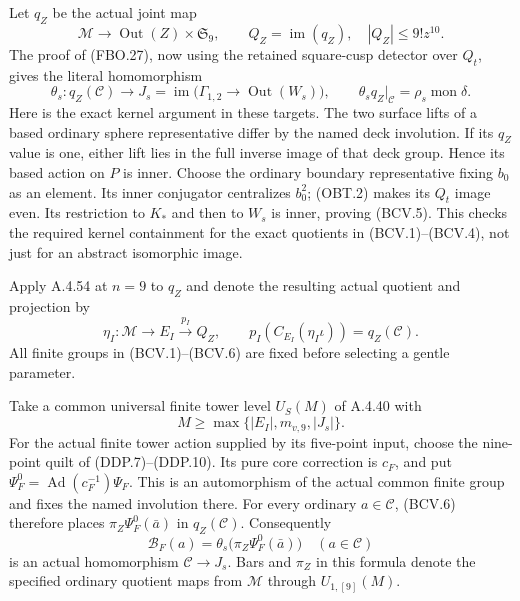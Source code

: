 Let $q_Z$ be the actual joint map
\[
 \mathcal M\longrightarrow
     \operatorname{Out}(Z)\times\mathfrak S_9,
       \qquad Q_Z=\operatorname{im}(q_Z),\quad
       |Q_Z|\leq9!z^{10}.
                                                               \tag{BCV.4}
\]
The proof of (FBO.27), now using the retained square-cusp
detector over $Q_t$, gives the literal homomorphism
\[
 \theta_s:q_Z(\mathcal C)\longrightarrow
 J_s=\operatorname{im}\bigl(\Gamma_{1,2}
                             \to\operatorname{Out}(W_s)\bigr),
 \qquad\theta_s q_Z|_{\mathcal C}=\rho_s\operatorname{mon}\delta.
                                                               \tag{BCV.5}
\]
Here is the exact kernel argument in these targets.  The two
surface lifts of a based ordinary sphere representative
differ by the named deck involution.  If its $q_Z$ value
is one, either lift lies in the full inverse image of that
deck group.  Hence its based action on $P$ is inner.
Choose the ordinary boundary representative fixing $b_0$
as an element.  Its inner conjugator centralizes $b_0^2$;
(OBT.2) makes its $Q_t$ image even.  Its restriction to
$K_*$ and then to $W_s$ is inner, proving (BCV.5).
This checks the required kernel containment for the exact
quotients in (BCV.1)--(BCV.4), not just for an abstract
isomorphic image.

Apply A.4.54 at $n=9$ to $q_Z$ and denote the resulting
actual quotient and projection by
\[
 \eta_I:\mathcal M\longrightarrow E_I
          \xrightarrow{p_I}Q_Z,
 \qquad p_I(C_{E_I}(\eta_I\iota))=q_Z(\mathcal C).
                                                               \tag{BCV.6}
\]
All finite groups in (BCV.1)--(BCV.6) are fixed before
selecting a gentle parameter.

Take a common universal finite tower level $U_S(M)$ of
A.4.40 with
\[
                  M\geq\max\{|E_I|,m_{v,9},|J_s|\}.
                                                               \tag{BCV.7}
\]
For the actual finite tower action supplied by its five-point
input, choose the nine-point quilt of (DDP.7)--(DDP.10).
Its pure core correction is $c_F$, and put
$\Psi_F^0=\operatorname{Ad}(c_F^{-1})\Psi_F$.
This is an automorphism of the actual common finite group
and fixes the named involution there.
For every ordinary $a\in\mathcal C$, (BCV.6) therefore
places $\pi_Z\Psi_F^0(\bar a)$ in $q_Z(\mathcal C)$.
Consequently
\[
       \mathcal B_F(a)
            =\theta_s\bigl(\pi_Z\Psi_F^0(\bar a)\bigr)
                               \quad(a\in\mathcal C)
                                                               \tag{BCV.8}
\]
is an actual homomorphism $\mathcal C\to J_s$.
Bars and $\pi_Z$ in this formula denote the specified
ordinary quotient maps from $\mathcal M$ through
$U_{1,[9]}(M)$.

